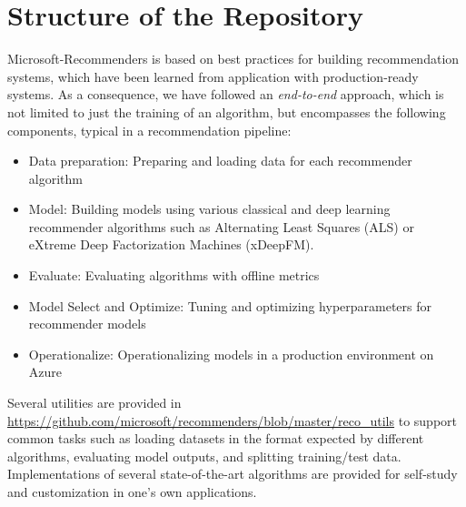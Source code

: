 \section{Structure of the Repository}

Microsoft-Recommenders is based on best practices for building recommendation systems, which have been learned from application with production-ready systems.
As a consequence, we have followed an {\em end-to-end} approach, which is not limited to just the training of an algorithm, but encompasses the following components, typical in a recommendation pipeline:

\begin{itemize}
\item Data preparation: Preparing and loading data for each recommender algorithm
\item Model: Building models using various classical and deep learning recommender algorithms such as Alternating Least Squares (ALS) or eXtreme Deep Factorization Machines (xDeepFM).
\item Evaluate: Evaluating algorithms with offline metrics
\item Model Select and Optimize: Tuning and optimizing hyperparameters for recommender models
\item Operationalize: Operationalizing models in a production environment on Azure
\end{itemize}

Several utilities are provided in \url{https://github.com/microsoft/recommenders/blob/master/reco_utils} to support common tasks such as loading datasets in the format expected by different algorithms, evaluating model outputs, and splitting training/test data. Implementations of several state-of-the-art algorithms are provided for self-study and customization in one's own applications.

